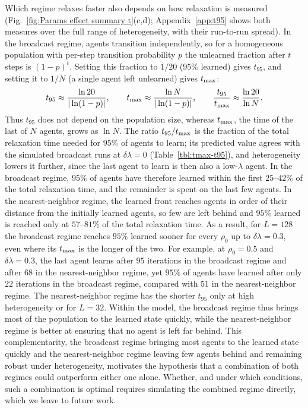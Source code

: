 \documentclass[a4paper,fleqn]{cas-sc}
\begin{document}
    Which regime relaxes faster also depends on how relaxation is measured (Fig.~\ref{fig:Params effect summary t}(c,d); Appendix~\ref{app:t95} shows both measures over the full range of heterogeneity, with their run-to-run spread).
    In the broadcast regime, agents transition independently, so for a homogeneous population with per-step transition probability $p$ the unlearned fraction after $t$ steps is $(1-p)^t$. Setting this fraction to $1/20$ ($95\%$ learned) gives $t_{95}$, and setting it to $1/N$ (a single agent left unlearned) gives $t_{\rm max}$:
    \begin{equation}
        t_{95}\approx\frac{\ln 20}{|\ln(1-p)|}, \qquad
        t_{\rm max}\approx\frac{\ln N}{|\ln(1-p)|}, \qquad
        \frac{t_{95}}{t_{\rm max}}\approx\frac{\ln 20}{\ln N}.
    \label{eq:tmax-t95}
    \end{equation}
    Thus $t_{95}$ does not depend on the population size, whereas $t_{\rm max}$, the time of the last of $N$ agents, grows as $\ln N$.
    The ratio $t_{95}/t_{\rm max}$ is the fraction of the total relaxation time needed for $95\%$ of agents to learn; its predicted value agrees with the simulated broadcast runs at $\delta\lambda=0$ (Table~\ref{tbl:tmax-t95}), and heterogeneity lowers it further, since the last agent to learn is then also a low-$\lambda$ agent.
    In the broadcast regime, $95\%$ of agents have therefore learned within the first $25$--$42\%$ of the total relaxation time, and the remainder is spent on the last few agents.
    In the nearest-neighbor regime, the learned front reaches agents in order of their distance from the initially learned agents, so few are left behind and $95\%$ learned is reached only at $57$--$81\%$ of the total relaxation time.
    As a result, for $L=128$ the broadcast regime reaches $95\%$ learned sooner for every $\rho_0$ up to $\delta\lambda=0.3$, even where its $t_{\rm max}$ is the longer of the two.
    For example, at $\rho_0=0.5$ and $\delta\lambda=0.3$, the last agent learns after $95$ iterations in the broadcast regime and after $68$ in the nearest-neighbor regime, yet $95\%$ of agents have learned after only $22$ iterations in the broadcast regime, compared with $51$ in the nearest-neighbor regime.
    The nearest-neighbor regime has the shorter $t_{95}$ only at high heterogeneity or for $L=32$.
    Within the model, the broadcast regime thus brings most of the population to the learned state quickly, while the nearest-neighbor regime is better at ensuring that no agent is left far behind.
    This complementarity, the broadcast regime bringing most agents to the learned state quickly and the nearest-neighbor regime leaving few agents behind and remaining robust under heterogeneity, motivates the hypothesis that a combination of both regimes could outperform either one alone. Whether, and under which conditions, such a combination is optimal requires simulating the combined regime directly, which we leave to future work.
\end{document}
